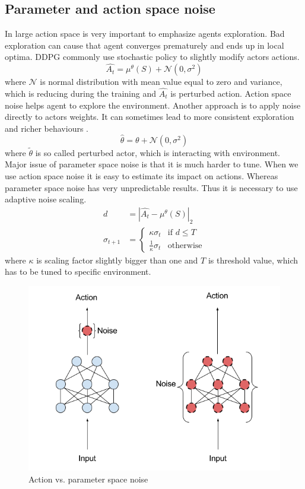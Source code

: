 \subsection{Parameter and action space noise}
In large action space is very important to emphasize agents exploration. Bad exploration can cause that agent converges prematurely and ends up in local optima. DDPG commonly use stochastic policy to slightly modify actors actions.
\begin{equation}
\hat{A_t} = \mu^\theta(S) + \mathcal{N}(0, \sigma^2)
\end{equation}
where $\mathcal{N}$ is normal distribution with mean value equal to zero and variance, which is reducing during the training and $\hat{A_t}$ is perturbed action. Action space noise helps agent to explore the environment. Another approach is to apply noise directly to actors weights. It can sometimes lead to more consistent exploration and richer behaviours \cite{plappert2017}.
\begin{equation}
\hat{\theta} = \theta + \mathcal{N}(0, \sigma^2)
\end{equation}
where $\tilde{\theta}$ is so called perturbed actor, which is interacting with environment. 
\clearpage
Major issue of parameter space noise is that it is much harder to tune. When we use action space noise it is easy to estimate its impact on actions. Whereas parameter space noise has very unpredictable results. Thus it is necessary to use adaptive noise scaling.
\begin{align}
d &= |\hat{A_t} - \mu^\theta(S)|_2  \\
\sigma_{t+1} &= 
     \begin{cases}
       \kappa \sigma_t & \text{if } d \leq T \\
       \frac{1}{\kappa}\sigma_t & \text{otherwise}
     \end{cases}
\end{align}
where $\kappa$ is scaling factor slightly bigger than one and $T$ is threshold value, which has to be tuned to specific environment.

\begin{figure}[!h]
\centering
\includegraphics[scale=0.5]{fig/perturbations.png}
\caption{Action vs. parameter space noise}
\end{figure}
